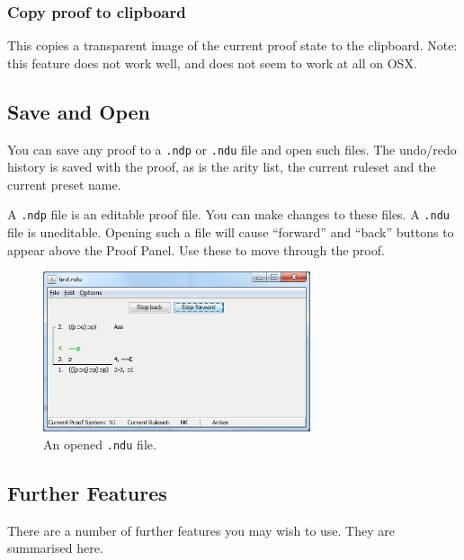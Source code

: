 \documentclass[a4paper]{article}
\begin{document}
\subsubsection{Copy proof to clipboard}
This copies a transparent image of the current proof state to the clipboard. Note: this feature does not work well, and does not seem to work at all on OSX.

\subsection{Save and Open}
You can save any proof to a \texttt{.ndp} or \texttt{.ndu} file and open such files. The undo/redo history is saved with the proof, as is the arity list, the current ruleset and the current preset name.

A \texttt{.ndp} file is an editable proof file. You can make changes to these files. A \texttt{.ndu} file is uneditable. Opening such a file will cause ``forward'' and ``back'' buttons to appear above the Proof Panel. Use these to move through the proof.

\begin{figure}
	\centering
		\includegraphics[width=0.70\textwidth]{images/ndu.png}
	\caption{An opened \texttt{.ndu} file.}
	\label{fig:ndu}
\end{figure}


\subsection{Further Features}
There are a number of further features you may wish to use. They are summarised here.
\end{document}
